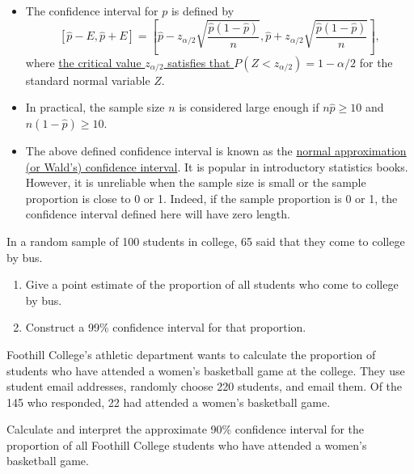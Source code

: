 \begin{itemize}
\item
  The confidence interval for \(p\) is defined by
  \[[\hat{p}-E,\hat{p}+E]=\left[\hat{p}-z_{\alpha/2}\sqrt{\frac{\hat{p}(1-\hat{p})}{n}}, \hat{p}+z_{\alpha/2}\sqrt{\frac{\hat{p}(1-\hat{p})}{n}}\right],\]
  where
  \href{https://saylordotorg.github.io/text_introductory-statistics/s11-01-large-sample-estimation-of-a-p.html}{the
  critical value \(z_{\alpha/2}\) satisfies that
  \(P(Z< z_{\alpha/2})=1-\alpha/2\)} for the standard normal variable
  \(Z\).
\item
  In practical, the sample size \(n\) is considered large enough if
  \(n\hat{p}\ge 10\) and \(n(1-\hat{p})\ge 10\).
\item
  The above defined confidence interval is known as the
  \href{https://en.wikipedia.org/wiki/Binomial_proportion_confidence_interval}{normal
  approximation (or Wald's) confidence interval}. It is popular in
  introductory statistics books. However, it is unreliable when the
  sample size is small or the sample proportion is close to 0 or 1.
  Indeed, if the sample proportion is 0 or 1, the confidence interval
  defined here will have zero length.
\end{itemize}



\begin{example}

In a random sample of 100 students in college, 65 said that they come to
college by bus.

\begin{enumerate}
\item
  Give a point estimate of the proportion of all students who come to
  college by bus.
\item
  Construct a 99\% confidence interval for that proportion.
\end{enumerate}

\end{example}
\vspace*{4\baselineskip}

\begin{example}
  
  Foothill College's athletic department wants to calculate the proportion
  of students who have attended a women's basketball game at the college.
  They use student email addresses, randomly choose 220 students, and
  email them. Of the 145 who responded, 22 had attended a women's
  basketball game.
  
  Calculate and interpret the approximate 90\% confidence interval for the
  proportion of all Foothill College students who have attended a women's
  basketball game.
  
\end{example}
\vspace*{8\baselineskip}


